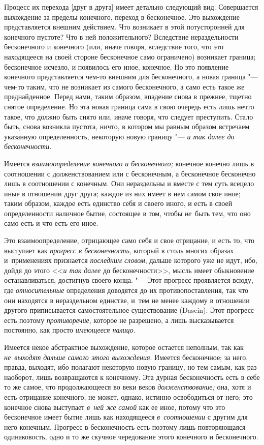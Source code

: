 Процесс их перехода [друг в друга] имеет детально следующий вид. Совершается
выхождение за пределы конечного, переход в бесконечное. Это выхождение
представляется внешним действием. Что возникает в этой потусторонней для
конечного пустоте? Что в ней положительного? Вследствие нераздельности
бесконечного и конечного (или, иначе говоря, вследствие того, что это
находящееся на своей стороне бесконечное само ограничено) возникает
граница; бесконечное исчезло, и появилось его иное, конечное. Но это
появление конечного представляется чем-то внешним для бесконечного, а
новая граница "--- чем-то таким, что не возникает из самого бесконечного, а
само есть такое же преднайденное. Перед нами, таким образом, впадение снова
в прежнее, тщетно снятое определение. Но эта новая граница сама в свою
очередь есть лишь нечто такое, что должно быть снято или, иначе говоря, что
следует преступить. Стало быть, снова возникла пустота, ничто, в котором мы
равным образом встречаем указанную определенность, некоторую новую границу
"--- {\em и так далее до бесконечности}.

Имеется {\em взаимоопределение конечного и бесконечного;} конечное конечно лишь
в соотношении с долженствованием или с бесконечным, а бесконечное бесконечно
лишь в соотношении с конечным. Они нераздельны и вместе с тем суть всецело иные
в отношении друг друга; каждое из них имеет в нем самом свое иное; таким
образом, каждое есть единство себя и своего иного, и есть в своей
определенности наличное бытие, состоящее в том, чтобы {\em не}~быть тем, что
оно само есть и что есть его иное.

Это взаимоопределение, отрицающее само себя и свое отрицание, и есть то, что
выступает как {\em прогресс в бесконечность}, который в столь многих образах
и~применениях признается {\em последним словом}, дальше которого уже не идут,
ибо, дойдя до этого <<{\em и так далее} до бесконечности>>, мысль имеет
обыкновение останавливаться, достигнув своего конца. "--- Этот прогресс
проявляется всюду, где {\em относительные} определения доводятся до их
противопоставления, так что они находятся в нераздельном единстве, и~тем не
менее каждому в отношении другого приписывается самостоятельное существование
(Dasein). Этот прогресс есть поэтому {\em противоречие}, которое не разрешено,
а лишь высказывается постоянно, как просто {\em имеющееся налицо}.

Имеется некое абстрактное выхождение, которое остается неполным, так как
{\em не~выходят дальше самого этого выхождения}. Имеется бесконечное; за него,
правда, выходят, ибо полагают некоторую новую границу, но тем самым, как раз
наоборот, лишь возвращаются к конечному. Эта дурная бесконечность есть в себе
то же самое, что продолжающееся во веки веков {\em долженствование;} она, хотя
и есть отрицание конечного, не может, однако, истинно освободиться от него; это
конечное снова выступает {\em в~ней же самой} как ее иное, потому что это
бесконечное имеет бытие лишь как находящееся {\em в~соотношении} с другим для
него конечным. Прогресс в бесконечность есть поэтому лишь повторяющаяся
одинаковость, одно и то же скучное чередование этого конечного и бесконечного.

